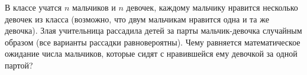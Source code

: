 В классе учатся $n$ мальчиков и $n$ девочек, каждому мальчику нравится несколько девочек из класса
(возможно, что двум мальчикам нравится одна и та же девочка). Злая учительница рассадила детей за парты
мальчик-девочка случайным образом (все варианты рассадки равновероятны). Чему равняется математическое
ожидание числа мальчиков, которые сидят с нравившейся ему девочкой за одной партой?
